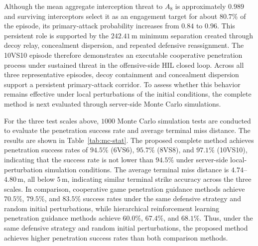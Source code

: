 \documentclass{cja}
\begin{document}
Although the mean aggregate interception threat to $A_8$ is approximately $0.989$ and surviving interceptors select it as an engagement target for about $80.7\%$ of the episode, its primary-attack probability increases from $0.84$ to $0.96$. This persistent role is supported by the $242.41\,\mathrm{m}$ minimum separation created through decoy relay, concealment dispersion, and repeated defensive reassignment. The 10VS10 episode therefore demonstrates an executable cooperative penetration process under sustained threat in the offensive-side HIL closed loop. Across all three representative episodes, decoy containment and concealment dispersion support a persistent primary-attack corridor. To assess whether this behavior remains effective under local perturbations of the initial conditions, the complete method is next evaluated through server-side Monte Carlo simulations.

For the three test scales above, $1000$ Monte Carlo simulation tests are conducted to evaluate the penetration success rate and average terminal miss distance. The results are shown in Table~\ref{tab:mc-stat}. The proposed complete method achieves penetration success rates of $94.5\%$ (6VS6), $95.7\%$ (8VS8), and $97.1\%$ (10VS10), indicating that the success rate is not lower than $94.5\%$ under server-side local-perturbation simulation conditions. The average terminal miss distance is $4.74$--$4.80\,\mathrm{m}$, all below $5\,\mathrm{m}$, indicating similar terminal strike accuracy across the three scales.
In comparison, cooperative game penetration guidance methods\cite{Chen2024CJA,Chen2024TAES} achieve $70.5\%$, $79.5\%$, and $83.5\%$ success rates under the same defensive strategy and random initial perturbations, while hierarchical reinforcement learning penetration guidance methods\cite{Hui2025CJA} achieve $60.0\%$, $67.4\%$, and $68.1\%$. Thus, under the same defensive strategy and random initial perturbations, the proposed method achieves higher penetration success rates than both comparison methods.
\end{document}

